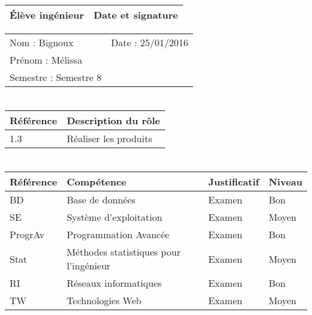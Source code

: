 \documentclass[11pt]{article}
\begin{document}

\begin{center}
\begin{table}[!hp]

	\begin{tabularx}{\linewidth}{|X|X|}
	\hline
	\rowcolor{gray!40} Élève ingénieur & Date et signature \\
	\hline
	\end{tabularx}
	\begin{tabularx}{\linewidth}{|X|X|}
	Nom : Bignoux & Date : 25/01/2016 \\ 
	Prénom : Mélissa & \\
	Semestre : Semestre 8 & \\
	\hline
	\end{tabularx}
\end{table}
\end{center}

\section*{\large\FR}

\begin{table}[!hp]
\centering
	\begin{tabularx}{\linewidth}{|X|X|}
	\hline
	\rowcolor{gray!40} Référence \WBSCourt & Description du rôle \\
	\hline
	 1.3 & Réaliser les produits \\
	 \hline
	\end{tabularx}
\end{table}


\section*{\large\FC}

\begin{table}[!hp]
\centering
	\begin{tabularx}{\linewidth}{|X|X|X|X|}
	\hline
	\rowcolor{gray!40} Référence & Compétence & Justificatif & Niveau \\
	\hline
	 BD & Base de données & Examen & Bon \\
	 \hline
	  SE & Système d'exploitation & Examen & Moyen\\
	  \hline
	  ProgrAv & Programmation Avancée & Examen & Bon\\
	  \hline
	  Stat & Méthodes statistiques pour l'ingénieur & Examen & Moyen \\ 
	  \hline
	  RI & Réseaux informatiques & Examen & Bon \\
	  \hline
	  TW & Technologies Web & Examen & Moyen \\
	  
	\hline
	\end{tabularx}
\end{table}
\end{document}
